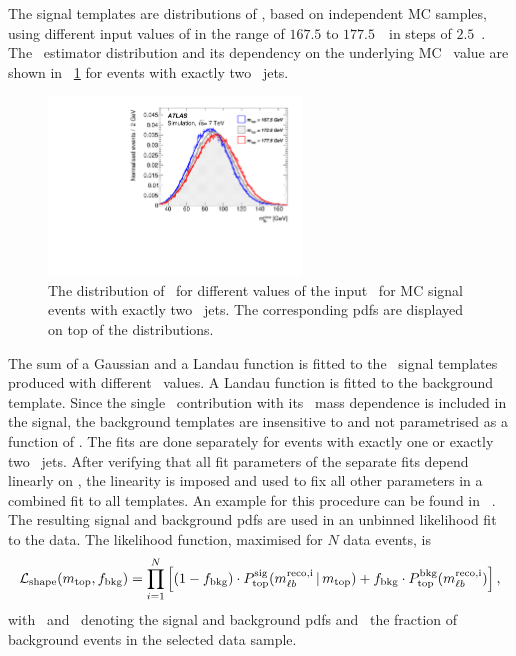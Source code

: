 The signal templates are distributions of \mlbr, based on independent \gls{MC} samples, using different input values of \mt in the range of $167.5$ to $177.5$~\GeV\ in steps of $2.5$~\GeV.
%
The \mlbr\ estimator distribution and its dependency on the underlying \gls{MC} \mt\ value are shown in \fig~\ref{fig:templtop7TeV} for events with exactly two \btagged\ jets. 
%
\begin{figure}[tbp!]
\centering
	\includegraphics[width=0.6\textwidth]{./figs/MC_fit_wp75_mlb_overlaid_ele0_dep0.pdf}
\caption[Template fit functions for $\sqrts=7$~\TeV\ data]{
%
The distribution of \mlbr\ for different values of the input \mt\ for \gls{MC} signal events with exactly two \btagged\ jets. 
%
The corresponding \glspl{pdf} are displayed on top of the distributions.
%
\label{fig:templtop7TeV}}
\end{figure}
%
%
The sum of a Gaussian and a Landau function is fitted to the \mlbr\ signal templates produced with different \mt\ values. 
%
A Landau function is fitted to the background template. 
%
Since the single \tquark\ contribution with its \tquark\ mass dependence is included in the signal, the background templates are insensitive to and not parametrised as a function of \mt. 
%
The fits are done separately for events with exactly one or exactly two \btagged\ jets. 
%
After verifying that all fit parameters of the separate fits depend linearly on \mt, the linearity is imposed and used to fix all other parameters in a combined fit to all templates. An example for this procedure can be found in ~\cite{Maier2012}.
%
The resulting signal and background \glspl{pdf} are used in an unbinned likelihood fit to the data.
%
The likelihood function, maximised for $N$ data events, is
%
\[
\mathcal{L}_\mathrm{shape}(m_{\mathrm{top}}, f_{\mathrm{bkg}}) = 
\prod_{i=1}^{N} 
\left[ (1-f_{\mathrm{bkg}})\cdot P_{\mathrm{top}}^{\mathrm{sig}}(m_{\ell b}^{\mathrm{reco,i}} \,\vert\, m_{\mathrm{top}}) + f_{\mathrm{bkg}} \cdot P_{\mathrm{top}}^{\mathrm{bkg}}(m_{\ell b}^{\mathrm{reco,i}}) \right],
\]
%
with \Ptopsig\ and \Ptopbkg\ denoting the signal and background \glspl{pdf} and \fbkg\ the fraction of background events in the selected data sample.

